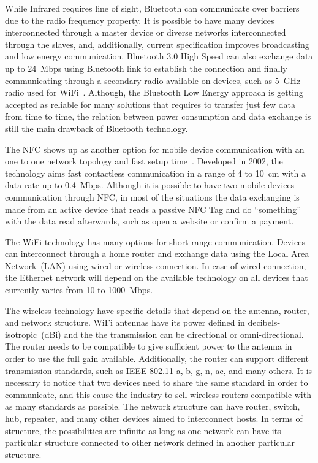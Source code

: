 While Infrared requires line of sight, Bluetooth can communicate over barriers due to the radio frequency property.
It is possible to have many devices interconnected through a master device or diverse networks interconnected through the slaves, and, additionally, current specification improves broadcasting and low energy communication.
Bluetooth 3.0 High Speed can also exchange data up to 24~Mbps using Bluetooth link to establish the connection and finally communicating through a secondary radio available on devices, such as 5~GHz radio used for WiFi~\citep{Bluetooth2009bluetooth}.
Although, the Bluetooth Low Energy approach is getting accepted as reliable for many solutions that requires to transfer just few data from time to time, the relation between power consumption and data exchange is still the main drawback of Bluetooth technology.

The NFC shows up as another option for mobile device communication with an one to one network topology and fast setup time~\citep{Coskun2013nfc}.
Developed in 2002, the technology aims fast contactless communication in a range of 4 to 10~cm with a data rate up to 0.4~Mbps.
Although it is possible to have two mobile devices communication through NFC, in most of the situations the data exchanging is made from an active device that reads a passive NFC Tag and do ``something'' with the data read afterwards, such as open a website or confirm a payment.

The WiFi technology has many options for short range communication.
Devices can interconnect through a home router and exchange data using the Local Area Network~(LAN) using wired or wireless connection.
In case of wired connection, the Ethernet network will depend on the available technology on all devices that currently varies from 10 to 1000~Mbps.

The wireless technology have specific details that depend on the antenna, router, and network structure.
WiFi antennas have its power defined in decibels-isotropic~(dBi) and the the transmission can be directional or omni-directional.
The router needs to be compatible to give sufficient power to the antenna in order to use the full gain available.
Additionally, the router can support different transmission standards, such as IEEE 802.11 a, b, g, n, ac, and many others.
It is necessary to notice that two devices need to share the same standard in order to communicate, and this cause the industry to sell wireless routers compatible with as many standards as possible.
The network structure can have router, switch, hub, repeater, and many other devices aimed to interconnect hosts.
In terms of structure, the possibilities are infinite as long as one network can have its particular structure connected to other network defined in another particular structure.


